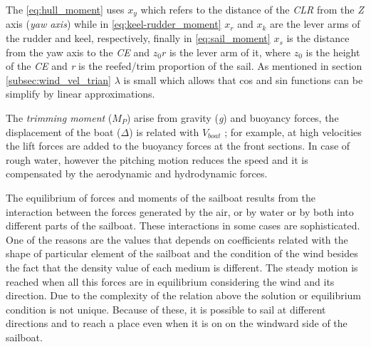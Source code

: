The \ref{eq:hull_moment} uses $x_{y}$ which refers to the distance of the \textit{CLR} from the \textit{Z} axis (\textit{yaw axis}) while in \ref{eq:keel-rudder_moment} $x_{r}$ and $x_{k}$ are the lever arms of the rudder and keel, respectively, finally in \ref{eq:sail_moment} $x_{s}$ is the distance from the yaw axis to the \textit{CE} and $z_{0}r$ is the lever arm of it, where $z_{0}$ is the height of the \textit{CE}  and \textit{r} is the reefed/trim proportion of the sail. As mentioned in section \ref{subsec:wind_vel_trian} $\lambda$ is small which allows that cos and sin functions can be simplify by linear approximations. \par 
The \textit{trimming moment} ($M_{P}$) arise from gravity (\textit{g}) and buoyancy forces, the displacement of the boat (\textit{$\Delta$}) is related with $V_{boat}$ ; for example, at high velocities the lift forces are added to the buoyancy forces at the front sections. 
In case of rough water, however the pitching motion reduces the speed and it is compensated by the aerodynamic and hydrodynamic forces\cite{claughton1998sailing}.\par %

The equilibrium of forces and moments of the sailboat results from the interaction between the forces generated by the air, or by  water or by both into different parts of the sailboat. These interactions in some cases are sophisticated. One of the reasons are the values that depends on coefficients related with the shape of particular element of the sailboat and the condition of the wind besides the fact that the density value of each medium is different. The steady motion is reached when all this forces are in equilibrium considering the wind and its direction. Due to the complexity of the relation above the solution or equilibrium condition is not unique. Because of these, it is possible to sail at different directions and to reach a place even when it is on on the windward side of the sailboat. %
